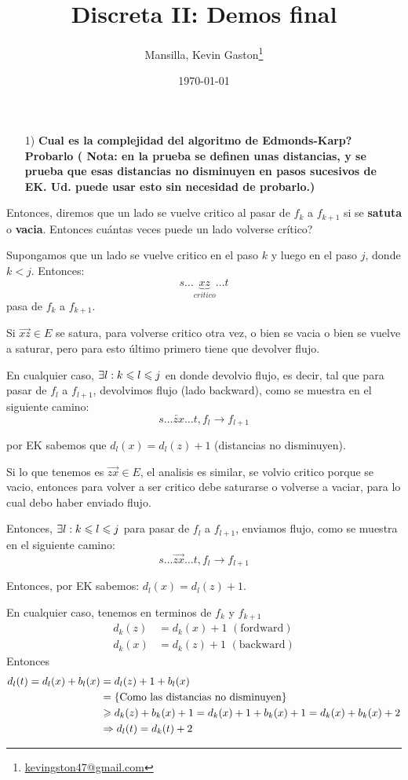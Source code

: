 \documentclass[12pt,a4paper]{article}
\author{Mansilla, Kevin Gaston\footnote{\href{mailto:kevingston47@gmail.com}{kevingston47@gmail.com}}}
\title{Discreta II: Demos final}
\date{\today}
\begin{document}
\maketitle{}

\begin{itemize}
    \item [1)] \textbf{Cual es la complejidad del algoritmo de Edmonds-Karp? Probarlo (
        Nota: en la prueba se definen unas distancias, y se prueba que esas 
        distancias no disminuyen en pasos sucesivos de EK. Ud. puede usar esto 
        sin necesidad de probarlo.)}
        \label{dem:EK}
\end{itemize}

Entonces, diremos que un lado se vuelve critico al pasar de $f_{k}$ a $f_{k+1}$ si 
se \textbf{satuta} o \textbf{vacia}. Entonces cuántas veces puede un lado volverse 
crítico?
\medskip

Supongamos que un lado se vuelve critico en el paso $k$ y luego en el paso $j$, 
donde $k < j$. Entonces:
$$s \ldots \underbrace{xz}_{critico}\ldots t$$
pasa de $f_{k}$ a $f_{k+1}$.
\medskip

Si $\overrightarrow{xz} \in E$ se satura, para volverse critico otra vez, o bien se 
vacia o bien se vuelve a saturar, pero para esto último primero tiene que devolver 
flujo.
\medskip

En cualquier caso, $\exists l: k \leqslant l \leqslant j$ en donde devolvio flujo, es decir, tal que 
para pasar de $f_{l}$ a $f_{l+1}$, devolvimos flujo (lado backward), como se muestra 
en el siguiente camino:
$$s \ldots \overleftarrow{zx} \ldots t, f_{l} \to f_{l+1}$$

por EK sabemos que $d_{l}(x) = d_{l}(z) + 1$ (distancias no disminuyen).
\medskip

Si lo que tenemos es $\overrightarrow{zx} \in E$, el analisis es similar, se volvio 
critico porque se vacio, entonces para volver a ser critico debe saturarse o volverse 
a vaciar, para lo cual debo haber enviado flujo.
\medskip

Entonces, $\exists l: k \leqslant l \leqslant j$ para pasar de $f_{l}$ a $f_{l+1}$, enviamos flujo, 
como se muestra en el siguiente camino:
$$s\ldots \overrightarrow{zx} \ldots t, f_{l} \to f_{l+1}$$

Entonces, por EK sabemos: $d_{l}(x) = d_{l}(z) + 1$.
\medskip

En cualquier caso, tenemos en terminos de $f_{k}$ y $f_{k+1}$
\begin{align*}
    d_{k}(z) &= d_{k}(x) +1 \,\,(\text{fordward})\\
    d_{k}(x) &= d_{k}(z) +1 \,\,(\text{backward})
\end{align*}
Entonces
\begin{align*}
    d_{l}(t) = d_{l}(x) + b_{l}(x) &= d_{l}(z) + 1 + b_{l}(x)\\
    &=\left\lbrace \text{Como las distancias no disminuyen} \right\rbrace\\
    &\geqslant d_{k}(z) + b_{k}(x) + 1 = d_{k}(x) + 1 + b_{k}(x) +1 = d_{k}(x) + b_{k}(x)+2\\
    &\Rightarrow d_{l}(t) = d_{k}(t) +2
\end{align*}
\end{document}
